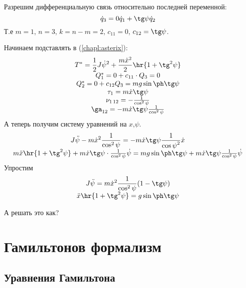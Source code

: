 \documentclass[a4paper,12pt]{article}
\begin{document}
Разрешим дифференциальную связь относительно последней переменной:
\begin{displaymath}
  \dot q_3 = 0\dot q_1+\tg\psi\dot q_2
\end{displaymath}
Т.е $m=1$, $n=3$, $k = n-m = 2$, $c_{11} =0$, $c_{12} = \tg\psi$.

Начинаем подставлять в (\ref{chapl:asterix}):
\begin{displaymath}
  \begin{array}{c}
    \displaystyle
    T^* = \half J{\dot \psi}^2 + \frac{m{\dot x}^2}{2}\hr{1+\tg^2\psi} \\
    Q_1^* = 0 +c_{11}\cdot Q_3 = 0 \\
    Q_2^* = 0 + c_{12}Q_3 = mg\sin\ph\tg\psi \\
    \tau_1 = m\dot x\tg\psi \\
    \nu_{1\,12} = -\frac{1}{{\cos^2\psi}} \\
    \ga_{12} = - m\dot x\tg\psi \frac{1}{{\cos^2\psi}}
  \end{array}
\end{displaymath}
А теперь получим систему уравнений на $x$,$\psi$.
\begin{displaymath}
  \begin{array}{c}
    \displaystyle
    J\ddot\psi - m{\dot x}^2\frac{1}{{\cos^2\psi}} = -m\dot x\tg\psi \frac{1}{{\cos\psi}^2}\dot x \\
    m\ddot x\hr{1+\tg^2\psi} +  m\dot x\tg\psi\cdot\frac{1}{\cos^2\psi}\dot\psi = mg\sin\ph\tg\psi +m\dot x\tg\psi \frac{1}{{\cos^2\psi}}\dot\psi
  \end{array}
\end{displaymath}
Упростим
\begin{displaymath}
    \begin{array}{c}
    \displaystyle
    J\ddot\psi =  m{\dot x}^2\frac{1}{{\cos^2\psi}}(1 - \tg\psi) \\
    \ddot x\hr{1+\tg^2\psi} = g\sin\ph\tg\psi
    \end{array}
\end{displaymath}
\begin{petit}
  А решать это как?
\end{petit}

\tbk

\section{Гамильтонов формализм}

\subsection{Уравнения Гамильтона}
\end{document}
